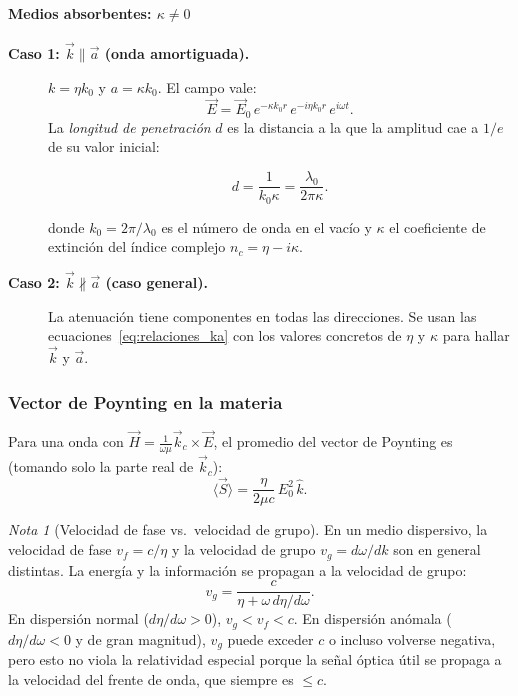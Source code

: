 \documentclass[12pt, a4paper]{article}
\theoremstyle{plain}
\theoremstyle{definition}
\theoremstyle{remark}
\newtheorem*{nota}{Nota}
\newcommand{\ve}[1]{\vec{#1}}
\newcommand{\uvec}[1]{\hat{#1}}
\begin{document}
\paragraph{Medios absorbentes: $\kappa \neq 0$}

\begin{description}
  \item[\textbf{Caso 1: $\ve{k}\parallel\ve{a}$ (onda amortiguada).}]
        $k = \eta k_0$ y $a = \kappa k_0$. El campo vale:
        \begin{equation}
          \ve{E} = \ve{E}_0\,e^{-\kappa k_0 r}\,e^{-i\eta k_0 r}\,e^{i\omega t}.
          \label{eq:absorbente}
        \end{equation}
        La \emph{longitud de penetración} $d$ es la distancia a la que la
        amplitud cae a $1/e$ de su valor inicial:
        \begin{mdframed}[style=resultado]
        \begin{equation}
          d = \frac{1}{k_0\kappa} = \frac{\lambda_0}{2\pi\kappa}.
          \label{eq:long_penetracion}
        \end{equation}
        \end{mdframed}
        donde $k_0 = 2\pi/\lambda_0$ es el número de onda en el vacío y $\kappa$ el coeficiente de extinción del índice complejo $n_c = \eta - i\kappa$.

  \item[\textbf{Caso 2: $\ve{k}\not\parallel\ve{a}$ (caso general).}]
        La atenuación tiene componentes en todas las direcciones. Se usan las
        ecuaciones~\eqref{eq:relaciones_ka} con los valores concretos de
        $\eta$ y $\kappa$ para hallar $\ve{k}$ y $\ve{a}$.
\end{description}

\subsubsection{Vector de Poynting en la materia}

Para una onda con $\ve{H} = \frac{1}{\omega\mu}\ve{k}_c\times\ve{E}$, el
promedio del vector de Poynting es (tomando solo la parte real de $\ve{k}_c$):
\begin{equation}
  \langle\ve{S}\rangle = \frac{\eta}{2\mu c}\,E_0^2\,\uvec{k}.
  \label{eq:poynting_mat}
\end{equation}

\begin{nota}[Velocidad de fase vs.\ velocidad de grupo]
En un medio dispersivo, la velocidad de fase $v_f = c/\eta$ y la velocidad
de grupo $v_g = d\omega/dk$ son en general distintas. La energía y la
información se propagan a la velocidad de grupo:
\[
  v_g = \frac{c}{\eta + \omega\,d\eta/d\omega}.
\]
En dispersión normal ($d\eta/d\omega > 0$), $v_g < v_f < c$. En dispersión
anómala ($d\eta/d\omega < 0$ y de gran magnitud), $v_g$ puede exceder $c$
o incluso volverse negativa, pero esto no viola la relatividad especial
porque la señal óptica útil se propaga a la velocidad del frente de onda,
que siempre es $\leq c$.
\end{nota}
\end{document}

